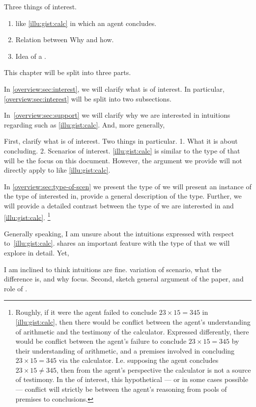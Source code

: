 \begin{note}
  Three things of interest.

  \begin{enumerate}
  \item
     like \autoref{illu:gist:calc} in which an agent concludes.
  \item
    Relation between Why and how.
  \item
    Idea of a \fc{}.
  \end{enumerate}

  This chapter will be split into three parts.

  In \autoref{overview:sec:interest}, we will clarify what is of interest.
  In particular, \autoref{overview:sec:interest} will be split into two subsections.

  In~\autoref{overview:sec:support} we will clarify why we are interested in intuitions regarding  such as \autoref{illu:gist:calc}.
  And, more generally, 
  
  

  First, clarify what is of interest.
  Two things in particular.
  1. What it is about concluding.
  2. Scenarios of interest.
  \autoref{illu:gist:calc} is similar to the type of  that will be the focus on this document.
  However, the argument we provide will not directly apply to  like \autoref{illu:gist:calc}.

  In \autoref{overview:sec:type-of-scen} we present the type of  we will present an instance of the type of  interested in, provide a general description of the  type.
  Further, we will provide a detailed contrast between the type of  we are interested in and \autoref{illu:gist:calc}.%
  \footnote{
    Roughly, if it were the agent failed to conclude \(23 \times 15 = 345\) in \autoref{illu:gist:calc}, then there would be conflict between the agent's understanding of arithmetic and the testimony of the calculator.
    Expressed differently, there would be conflict between the agent's failure to conclude \(23 \times 15 = 345\) by their understanding of arithmetic, and a premises involved in concluding \(23 \times 15 = 345\) via the calculator.
    I.e. supposing the agent concludes \(23 \times 15 \ne 345\), then from the agent's perspective the calculator is not a source of testimony.
    In the  of interest, this hypothetical --- or in some cases possible --- conflict will strictly be between the agent's reasoning from pools of premises to conclusions.
  }

  Generally speaking, I am unsure about the intuitions expressed with respect to~\autoref{illu:gist:calc}.
   shares an important feature with the type of  that we will explore in detail.
  Yet, 


  
  I am inclined to think intuitions are fine.
  variation of scenario, what the difference is, and why focus.
  Second, sketch general argument of the paper, and role of .
\end{note}


